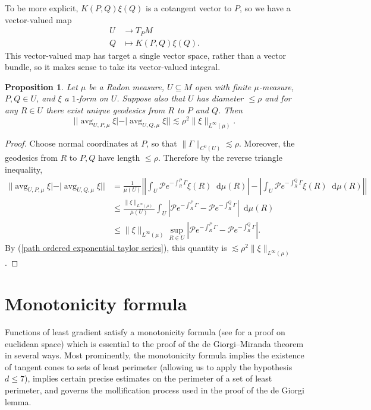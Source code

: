 \documentclass[reqno,11pt]{amsart}
\DeclareMathOperator{\avg}{avg}
\newcommand*\dif{\mathop{}\!\mathrm{d}}
\newtheorem{proposition}[theorem]{Proposition}
\theoremstyle{definition}
\numberwithin{equation}{section}
\begin{document}
To be more explicit, $K(P, Q)\xi(Q)$ is a cotangent vector to $P$, so we have a vector-valued map 
\begin{align*}
U &\to T_PM \\
Q &\mapsto K(P, Q)\xi(Q).
\end{align*}
This vector-valued map has target a single vector space, rather than a vector bundle, so it makes sense to take its vector-valued integral.

\begin{proposition}\label{translation invariance}
Let $\mu$ be a Radon measure, $U \subseteq M$ open with finite $\mu$-measure, $P, Q \in U$, and $\xi$ a $1$-form on $U$.
Suppose also that $U$ has diameter $\leq \rho$ and for any $R \in U$ there exist unique geodesics from $R$ to $P$ and $Q$.
Then 
$$||\avg_{U, P, \mu} \xi| - |\avg_{U, Q, \mu} \xi|| \lesssim \rho^2 \|\xi\|_{L^\infty(\mu)}.$$
\end{proposition}
\begin{proof}
Choose normal coordinates at $P$, so that $\|\Gamma\|_{C^0(U)} \lesssim \rho$.
Moreover, the geodesics from $R$ to $P, Q$ have length $\leq \rho$.
Therefore by the reverse triangle inequality,
\begin{align*}
||\avg_{U, P, \mu} \xi| - |\avg_{U, Q, \mu} \xi||
&= \frac{1}{\mu(U)} \left|\left|\int_U \mathcal P e^{-\int_R^P \Gamma} \xi(R) \dif \mu(R)\right| - \left|\int_U \mathcal P e^{-\int_R^Q \Gamma} \xi(R) \dif \mu(R)\right|\right| \\
&\leq \frac{\|\xi\|_{L^\infty(\mu)}}{\mu(U)} \int_U \left|\mathcal P e^{-\int_R^P \Gamma} - \mathcal Pe^{-\int_R^Q \Gamma}\right| \dif \mu(R) \\
&\leq \|\xi\|_{L^\infty(\mu)} \sup_{R \in U} \left|\mathcal Pe^{-\int_R^P \Gamma} - \mathcal Pe^{-\int_R^Q \Gamma}\right|.
\end{align*}
By (\ref{path ordered exponential taylor series}), this quantity is $\lesssim \rho^2 \|\xi\|_{L^\infty(\mu)}$.
\end{proof}


\section{Monotonicity formula}\label{MollifierSection}
Functions of least gradient satisfy a monotonicity formula (see \cite[Theorem 5.12]{Giusti77} for a proof on euclidean space) which is essential to the proof of the de Giorgi--Miranda theorem in several ways.
Most prominently, the monotonicity formula implies the existence of tangent cones to sets of least perimeter (allowing us to apply the hypothesis $d \leq 7$), implies certain precise estimates on the perimeter of a set of least perimeter, and governs the mollification process used in the proof of the de Giorgi lemma.
\end{document}
